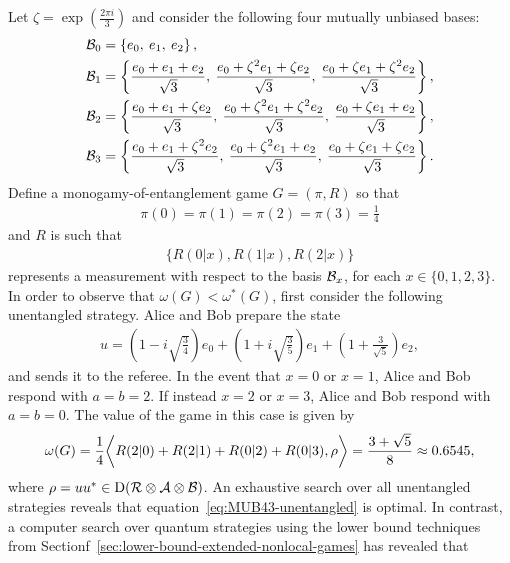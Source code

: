 \begin{example}\label{ex:mub-4-3-monogamy-game}
  Let $\zeta = \exp(\frac{2 \pi i}{3})$ and consider the following four mutually unbiased bases:
  \begin{equation}\label{eq:MUB43}
    \begin{aligned}
      \mathcal{B}_0 &= \left\{ e_0,\: e_1,\: e_2 \right\}, \\
      \mathcal{B}_1 &= \left\{ \frac{e_0 + e_1 + e_2}{\sqrt{3}},\:
      \frac{e_0 + \zeta^2 e_1 + \zeta e_2}{\sqrt{3}},\:
      \frac{e_0 + \zeta e_1 + \zeta^2 e_2}{\sqrt{3}} \right\}, \\
      \mathcal{B}_2 &= \left\{ \frac{e_0 + e_1 + \zeta e_2}{\sqrt{3}},\:
      \frac{e_0 + \zeta^2 e_1 + \zeta^2 e_2}{\sqrt{3}},\:
      \frac{e_0 + \zeta e_1 + e_2}{\sqrt{3}} \right\}, \\
      \mathcal{B}_3 &= \left\{ \frac{e_0 + e_1 + \zeta^2 e_2}{\sqrt{3}},\:
      \frac{e_0 + \zeta^2 e_1 + e_2}{\sqrt{3}},\:
      \frac{e_0 + \zeta e_1 + \zeta e_2}{\sqrt{3}} \right\}.
    \end{aligned}
  \end{equation} 
 	Define a monogamy-of-entanglement game $G = (\pi,R)$ so that  
 	\begin{align}
 		\pi(0) = \pi(1) = \pi(2) = \pi(3) = \frac{1}{4}
 	\end{align}
 	and $R$ is such that 
 	\begin{align}
 		\{ R(0|x), R(1|x), R(2|x) \}
 	\end{align} 
 	represents a measurement with respect to the basis $\mathcal{B}_x$, for each $x \in \{0,1,2,3\}$. In order to observe that $\omega(G) < \omega^*(G)$, first consider the following unentangled strategy. Alice and Bob prepare the state 
 	\begin{align}
 		u = \left( 1 - i \sqrt{\frac{3}{4}} \right) e_0 + \left( 1 + i \sqrt{\frac{3}{5}} \right) e_1 + \left( 1 + \frac{3}{\sqrt{5}} \right) e_2,
 	\end{align}
 	and sends it to the referee. In the event that $x = 0$ or $x = 1$, Alice and Bob respond with $a = b = 2$. If instead $x = 2$ or $x = 3$, Alice and Bob respond with $a = b = 0$. The value of the game in this case is given by 
 	\begin{align} \label{eq:MUB43-unentangled}
 		\omega(G) = \frac{1}{4}\biggl\langle R(2|0) + R(2|1) + R(0|2) + R(0|3), \rho \biggr\rangle = \frac{3 + \sqrt{5}}{8} \approx 0.6545,
 	\end{align}
 	where $\rho = u u^* \in \mathrm{D}(\mathcal{R} \otimes \mathcal{A} \otimes \mathcal{B})$. An exhaustive search over all unentangled strategies reveals that equation~\eqref{eq:MUB43-unentangled} is optimal. In contrast, a computer search over quantum strategies using the lower bound techniques from Sectionf~\ref{sec:lower-bound-extended-nonlocal-games} has revealed that 

\end{example}
